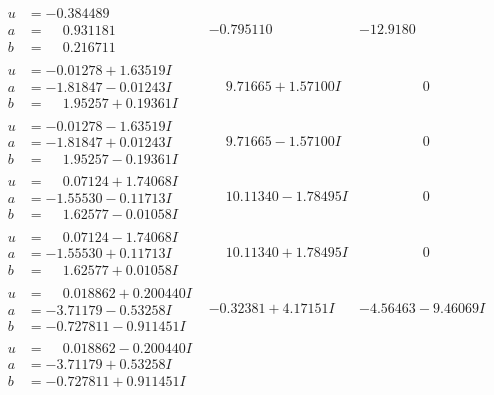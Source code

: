 \documentclass[1p]{elsarticle_modified}
\theoremstyle{definition}
\begin{document}
$$\begin{array}{c|c|c}
\begin{aligned}
u &= -0.384489\phantom{ +0.000000I} \\
a &= \phantom{-}0.931181\phantom{ +0.000000I} \\
b &= \phantom{-}0.216711\phantom{ +0.000000I}\end{aligned}
 & -0.795110\phantom{ +0.000000I} & -12.9180\phantom{ +0.000000I} \\ \hline\begin{aligned}
u &= -0.01278 + 1.63519 I \\
a &= -1.81847 - 0.01243 I \\
b &= \phantom{-}1.95257 + 0.19361 I\end{aligned}
 & \phantom{-}9.71665 + 1.57100 I & \phantom{-0.000000 } 0 \\ \hline\begin{aligned}
u &= -0.01278 - 1.63519 I \\
a &= -1.81847 + 0.01243 I \\
b &= \phantom{-}1.95257 - 0.19361 I\end{aligned}
 & \phantom{-}9.71665 - 1.57100 I & \phantom{-0.000000 } 0 \\ \hline\begin{aligned}
u &= \phantom{-}0.07124 + 1.74068 I \\
a &= -1.55530 - 0.11713 I \\
b &= \phantom{-}1.62577 - 0.01058 I\end{aligned}
 & \phantom{-}10.11340 - 1.78495 I & \phantom{-0.000000 } 0 \\ \hline\begin{aligned}
u &= \phantom{-}0.07124 - 1.74068 I \\
a &= -1.55530 + 0.11713 I \\
b &= \phantom{-}1.62577 + 0.01058 I\end{aligned}
 & \phantom{-}10.11340 + 1.78495 I & \phantom{-0.000000 } 0 \\ \hline\begin{aligned}
u &= \phantom{-}0.018862 + 0.200440 I \\
a &= -3.71179 - 0.53258 I \\
b &= -0.727811 - 0.911451 I\end{aligned}
 & -0.32381 + 4.17151 I & -4.56463 - 9.46069 I \\ \hline\begin{aligned}
u &= \phantom{-}0.018862 - 0.200440 I \\
a &= -3.71179 + 0.53258 I \\
b &= -0.727811 + 0.911451 I\end{aligned}

\end{array}$$
\end{document}
